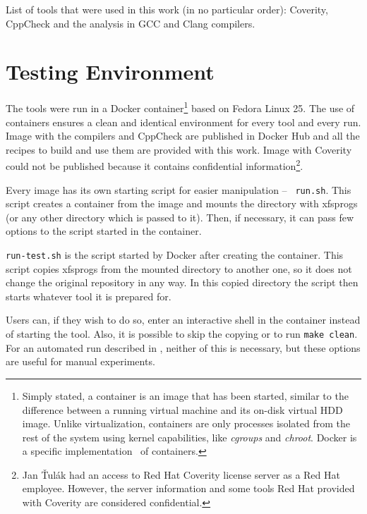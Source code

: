 List of tools that were used in this work (in no particular order): Coverity,
CppCheck and the analysis in GCC and Clang compilers.


\section{Testing Environment}\label{chap:techniques:env}

The tools were run in a Docker container\footnote{Simply stated, a
	container is an image that has been started, similar to the
		difference between a running virtual machine and its
		on-disk virtual HDD image. Unlike virtualization,
		containers are only processes isolated from the rest of the
system using kernel capabilities, like {\em cgroups} and {\em chroot}.
Docker is a specific implementation~\cite{docker} of containers.} based on Fedora Linux
25. The use of containers ensures a clean and identical environment for
every tool and every run. Image with the compilers and CppCheck are published
in Docker Hub and all the recipes to build and use them are provided with
this work. Image with Coverity could not be published because it contains
confidential information\footnote{Jan Ťulák had an access to Red Hat Coverity license
server as a Red Hat employee. However, the server information and some tools
	Red Hat provided with Coverity are considered confidential.}.

Every image has its own starting script for easier manipulation -- {\tt
run.sh}.  This script creates a container from the image and mounts the
directory with xfsprogs (or any other directory which is passed to it).
Then, if necessary, it can pass few options to the script started in
the container.

{\tt run-test.sh} is the script started by Docker after creating the container.
This script copies xfsprogs from the mounted directory to another one, so it
does not change the original repository in any way. In this copied directory
the script then starts whatever tool it is prepared for.

Users can, if they wish to do so, enter an interactive shell in the container
instead of starting the tool. Also, it is possible to skip the copying or to
run {\tt make clean}. For an automated run described in
, neither of this is necessary, but these
options are useful for manual experiments.


